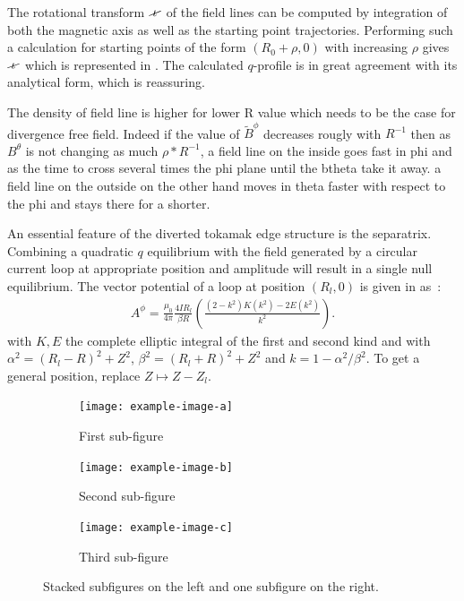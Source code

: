 The rotational transform $\iotaslash$ of the field lines can be computed by integration of both the magnetic axis as well as the starting point trajectories. Performing such a calculation for starting points of the form $(R_0+\rho,0)$ with increasing $\rho$ gives $\iotaslash$ which is represented in . The calculated $q$-profile is in great agreement with its analytical form, which is reassuring.

The density of field line is higher for lower R value which needs to be the case for divergence free field. Indeed if the value of $\tilde{B}^\phi$ decreases rougly with $R^{-1}$ then as $B^\theta$ is not changing as much $\rho*R^{-1}$, a field line on the inside goes fast in phi and as the time to cross several times the phi plane until the btheta take it away. a field line on the outside on the other hand moves in theta faster with respect to the phi and stays there for a shorter.

An essential feature of the diverted tokamak edge structure is the separatrix. Combining a quadratic $q$ equilibrium with the field generated by a circular current loop at appropriate position and amplitude will result in a single null equilibrium. The vector potential of a loop at position $(R_l, 0)$ is given in \cite{simpson_simple_2001} as~:
\begin{align*}
    A^\phi = \frac{\mu_0}{4\pi}\frac{4IR_l}{\beta R}\left(\frac{(2-k^2)K(k^2)-2E(k^2)}{k^2}\right).
\end{align*}
with $K, E$ the complete elliptic integral of the first and second kind and with $\alpha^2 = (R_l-R)^2 + Z^2$, $\beta^2 = (R_l+R)^2+Z^2$ and $k = 1 - \alpha^2/\beta^2$. To get a general position, replace $Z \mapsto Z-Z_l$.

\begin{figure}[H]
    \centering
    \begin{minipage}{0.6\textwidth} %
        \centering
        \begin{subfigure}[b]{0.5\textwidth}
            \centering
            \texttt{[image: example-image-a]}
            \caption{First sub-figure}
            \label{fig:left1}
        \end{subfigure}
        \vfill
        \begin{subfigure}[b]{0.5\textwidth}
            \centering
            \texttt{[image: example-image-b]}
            \caption{Second sub-figure}
            \label{fig:left2}
        \end{subfigure}
    \end{minipage}%
    \begin{minipage}{0.4\textwidth} %
        \centering
        \begin{subfigure}[b]{\textwidth}
            \centering
            \texttt{[image: example-image-c]}
            \caption{Third sub-figure}
            \label{fig:right}
        \end{subfigure}
    \end{minipage}
    \caption{Stacked subfigures on the left and one subfigure on the right.}
    \label{fig:main}
\end{figure}

